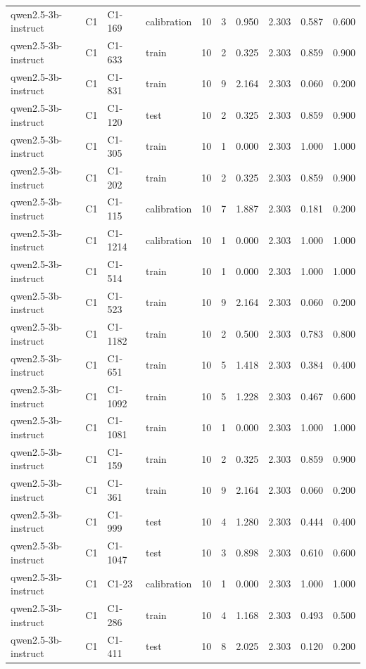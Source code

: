 \begin{table}
\begin{tabular}{llllrrrrrr}
qwen2.5-3b-instruct & C1 & C1-169 & calibration & 10 & 3 & 0.950 & 2.303 & 0.587 & 0.600 \\
qwen2.5-3b-instruct & C1 & C1-633 & train & 10 & 2 & 0.325 & 2.303 & 0.859 & 0.900 \\
qwen2.5-3b-instruct & C1 & C1-831 & train & 10 & 9 & 2.164 & 2.303 & 0.060 & 0.200 \\
qwen2.5-3b-instruct & C1 & C1-120 & test & 10 & 2 & 0.325 & 2.303 & 0.859 & 0.900 \\
qwen2.5-3b-instruct & C1 & C1-305 & train & 10 & 1 & 0.000 & 2.303 & 1.000 & 1.000 \\
qwen2.5-3b-instruct & C1 & C1-202 & train & 10 & 2 & 0.325 & 2.303 & 0.859 & 0.900 \\
qwen2.5-3b-instruct & C1 & C1-115 & calibration & 10 & 7 & 1.887 & 2.303 & 0.181 & 0.200 \\
qwen2.5-3b-instruct & C1 & C1-1214 & calibration & 10 & 1 & 0.000 & 2.303 & 1.000 & 1.000 \\
qwen2.5-3b-instruct & C1 & C1-514 & train & 10 & 1 & 0.000 & 2.303 & 1.000 & 1.000 \\
qwen2.5-3b-instruct & C1 & C1-523 & train & 10 & 9 & 2.164 & 2.303 & 0.060 & 0.200 \\
qwen2.5-3b-instruct & C1 & C1-1182 & train & 10 & 2 & 0.500 & 2.303 & 0.783 & 0.800 \\
qwen2.5-3b-instruct & C1 & C1-651 & train & 10 & 5 & 1.418 & 2.303 & 0.384 & 0.400 \\
qwen2.5-3b-instruct & C1 & C1-1092 & train & 10 & 5 & 1.228 & 2.303 & 0.467 & 0.600 \\
qwen2.5-3b-instruct & C1 & C1-1081 & train & 10 & 1 & 0.000 & 2.303 & 1.000 & 1.000 \\
qwen2.5-3b-instruct & C1 & C1-159 & train & 10 & 2 & 0.325 & 2.303 & 0.859 & 0.900 \\
qwen2.5-3b-instruct & C1 & C1-361 & train & 10 & 9 & 2.164 & 2.303 & 0.060 & 0.200 \\
qwen2.5-3b-instruct & C1 & C1-999 & test & 10 & 4 & 1.280 & 2.303 & 0.444 & 0.400 \\
qwen2.5-3b-instruct & C1 & C1-1047 & test & 10 & 3 & 0.898 & 2.303 & 0.610 & 0.600 \\
qwen2.5-3b-instruct & C1 & C1-23 & calibration & 10 & 1 & 0.000 & 2.303 & 1.000 & 1.000 \\
qwen2.5-3b-instruct & C1 & C1-286 & train & 10 & 4 & 1.168 & 2.303 & 0.493 & 0.500 \\
qwen2.5-3b-instruct & C1 & C1-411 & test & 10 & 8 & 2.025 & 2.303 & 0.120 & 0.200 \\

\end{tabular}
\end{table}
